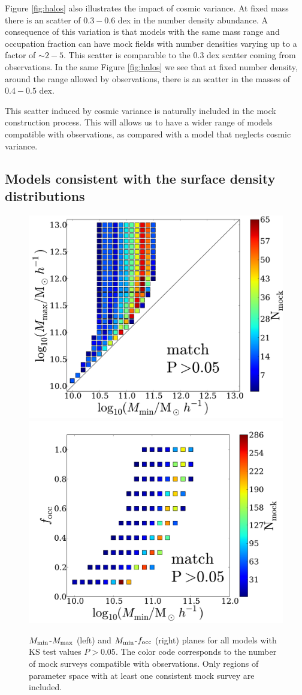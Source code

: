 \documentclass[usenatbib]{mn2e}
\begin{document}
Figure \ref{fig:halos} also illustrates the impact of cosmic
variance. At fixed mass there is an scatter of $0.3-0.6$ dex in the
number density abundance.  A consequence of this variation is that
models with the same mass range and occupation fraction can have mock
fields with number densities varying up to a factor of $\sim
2-5$. This scatter is comparable to the $0.3$ dex scatter coming from 
observations. In the same Figure \ref{fig:halos} we see that at fixed
number density, around the range allowed by observations, there is an
scatter in the masses of $0.4-0.5$ dex.  

This scatter induced by cosmic variance is naturally included in the
mock construction process. This will allows us to have a wider range
of models compatible with observations, as compared with a model that
neglects cosmic variance.


\subsection{Models consistent with the surface density distributions}

\begin{figure}
\begin{center}
\includegraphics[width=0.46\linewidth,angle=0]{Fig2_match_P5.pdf}
\vspace{5mm}
\includegraphics[width=0.49\linewidth,angle=0]{Fig3_match_P5.pdf}
\end{center} 
\caption{$M_{\rm min}$-$M_{\rm max}$ (left) and $M_{\rm    min}$-$f_{\rm
    occ}$ (right) planes for all models with  KS test values
  $P>0.05$. The color code corresponds to the number of mock surveys
  compatible with observations. Only regions of parameter  space with
  at least one consistent mock survey are  included. \label{fig:landscape}}     
\end{figure}
\end{document}
